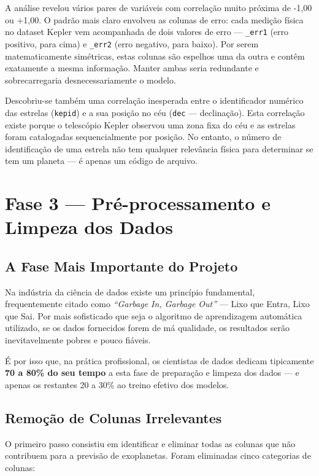 \documentclass[12pt, a4paper]{report}
\begin{document}
A análise revelou vários pares de variáveis com correlação muito próxima de -1,00 ou +1,00. O padrão mais claro envolveu as colunas de erro: cada medição física no dataset Kepler vem acompanhada de dois valores de erro — \texttt{\_err1} (erro positivo, para cima) e \texttt{\_err2} (erro negativo, para baixo). Por serem matematicamente simétricas, estas colunas são espelhos uma da outra e contêm exatamente a mesma informação. Manter ambas seria redundante e sobrecarregaria desnecessariamente o modelo.

Descobriu-se também uma correlação inesperada entre o identificador numérico das estrelas (\texttt{kepid}) e a sua posição no céu (\texttt{dec} — declinação). Esta correlação existe porque o telescópio Kepler observou uma zona fixa do céu e as estrelas foram catalogadas sequencialmente por posição. No entanto, o número de identificação de uma estrela não tem qualquer relevância física para determinar se tem um planeta — é apenas um código de arquivo.

\chapter{Fase 3 — Pré-processamento e Limpeza dos Dados}

\section{A Fase Mais Importante do Projeto}

Na indústria da ciência de dados existe um princípio fundamental, frequentemente citado como \textit{``Garbage In, Garbage Out''} — Lixo que Entra, Lixo que Sai. Por mais sofisticado que seja o algoritmo de aprendizagem automática utilizado, se os dados fornecidos forem de má qualidade, os resultados serão inevitavelmente pobres e pouco fiáveis.

É por isso que, na prática profissional, os cientistas de dados dedicam tipicamente \textbf{70 a 80\% do seu tempo} a esta fase de preparação e limpeza dos dados — e apenas os restantes 20 a 30\% ao treino efetivo dos modelos.

\section{Remoção de Colunas Irrelevantes}

O primeiro passo consistiu em identificar e eliminar todas as colunas que não contribuem para a previsão de exoplanetas. Foram eliminadas cinco categorias de colunas:
\end{document}
